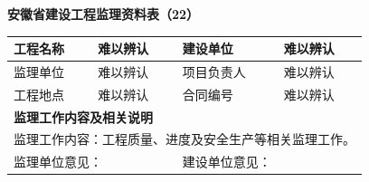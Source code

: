 \documentclass[UTF8,10pt,a4paper,fontset=fandol]{ctexart}
\newcommand{\fieldvalue}[1]{#1}
\newcommand{\handwritten}[1]{#1}
\begin{document}
\begin{center}
\textbf{安徽省建设工程监理资料表（22）}\\
\end{center}

\begin{flushright}
\end{flushright}

\small
\begin{tabularx}{\textwidth}{|p{2.6cm}|X|p{2.6cm}|X|}
\hline
工程名称 &
\fieldvalue{\handwritten{难以辨认}} &
建设单位 &
\fieldvalue{\handwritten{难以辨认}} \\
\hline
监理单位 &
\fieldvalue{\handwritten{难以辨认}} &
项目负责人 &
\fieldvalue{\handwritten{难以辨认}} \\
\hline
工程地点 &
\fieldvalue{\handwritten{难以辨认}} &
合同编号 &
\fieldvalue{\handwritten{难以辨认}} \\
\hline
\multicolumn{4}{|l|}{\textbf{监理工作内容及相关说明}} \\
\hline
\multicolumn{4}{|p{\textwidth}|}{
监理工作内容：工程质量、进度及安全生产等相关监理工作。
} \\
\hline
\multicolumn{2}{|p{0.47\textwidth}|}{
监理单位意见：\newline\rule{0pt}{1.2cm}
} &
\multicolumn{2}{p{0.47\textwidth}|}{
建设单位意见：\newline\rule{0pt}{1.2cm}
} \\
\hline
\end{tabularx}

\normalsize

\end{document}
